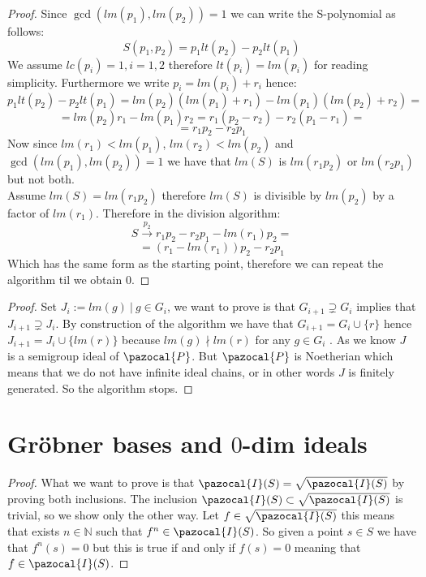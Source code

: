 \documentclass[11pt,a4paper]{report}
\theoremstyle{plain}
\theoremstyle{definition}
\newcommand{\Po}{\pazocal{P}}
\newcommand{\I}{\pazocal{I}}
\begin{document}
\begin{lem-hand}[2.2.13]
\end{lem-hand}
\begin{proof}
	Since $\gcd(lm(p_1),lm(p_2)) = 1$ we can write the S-polynomial as follows:
	\[
		S(p_1, p_2) = p_1lt(p_2) - p_2lt(p_1)
	\]
	We assume $lc(p_i) = 1, i = 1,2$ therefore $lt(p_i) = lm(p_i)$ for reading simplicity. Furthermore we write $p_i = lm(p_i) + r_i$ hence:
	\[
		p_1lt(p_2) - p_2lt(p_1) = lm(p_2)(lm(p_1) + r_1) - lm(p_1)(lm(p_2) + r_2) =
	\]
	\[
		= lm(p_2)r_1 - lm(p_1)r_2 = r_1(p_2 - r_2) - r_2(p_1 - r_1) =
	\]
	\[
		= r_1p_2 - r_2p_1	
	\]
	Now since $lm(r_1) < lm(p_1)$, $lm(r_2) < lm(p_2)$ and $\gcd(lm(p_1),lm(p_2)) = 1$ we have that $lm(S)$ is $lm(r_1p_2)$ or $lm(r_2p_1)$ but not both.\\
	Assume $lm(S) = lm(r_1p_2)$ therefore $lm(S)$ is divisible by $lm(p_2)$ by a factor of $lm(r_1)$. Therefore in the division algorithm:
	\[
		S \xrightarrow{p_2}  r_1p_2 - r_2p_1 - lm(r_1)p_2 = 	
	\]
	\[
		= (r_1 - lm(r_1))p_2 - r_2p_1	
	\]
	Which has the same form as the starting point, therefore we can repeat the algorithm til we obtain $0$.
\end{proof}

\begin{prop-hand}[2.2.14]
\end{prop-hand}
\begin{proof}
	Set $J_i := {lm(g)\ |\ g \in G_i}$, we want to prove is that $G_{i+1} \supsetneq G_i$ implies that $J_{i+1} \supsetneq J_i$. By construction of the algorithm we have that $G_{i+1} = G_i \cup \{r\}$ hence $J_{i+1} = J_i \cup \{lm(r)\}$ because $lm(g) \nmid lm(r)$ for any $g \in G_i$ . As we know $J$ is a semigroup ideal of $\Po$. But $\Po$ is Noetherian which means that we do not have infinite ideal chains, or in other words $J$ is finitely generated. So the algorithm stops.
\end{proof}

\chapter{Gr\"obner bases and $0$-dim ideals}

\begin{ex-hand}[3.5.1]
\end{ex-hand}
\begin{proof}
	What we want to prove is that $\I(S) = \sqrt{\I(S)}$ by proving both inclusions. The inclusion $\I(S) \subset \sqrt{\I(S)}$ is trivial, so we show only the other way.
	Let $f 	\in \sqrt{\I(S)}$ this means that exists $n \in \mathbb{N}$ such that $f^n \in \I(S)$. So given a point $s \in S$ we have that $f^n(s) = 0$ but this is true if and only if $f(s) = 0$ meaning that $f \in \I(S)$.
\end{proof}
\end{document}
